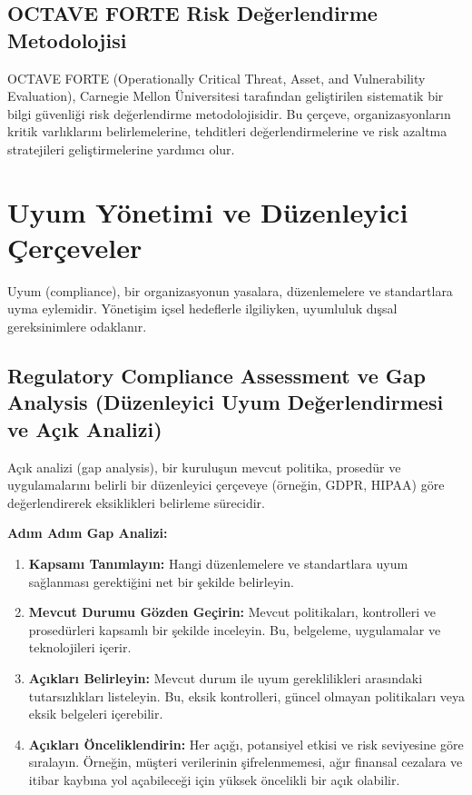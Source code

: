 \subsection{OCTAVE FORTE Risk Değerlendirme Metodolojisi}



OCTAVE FORTE (Operationally Critical Threat, Asset, and Vulnerability Evaluation), Carnegie Mellon Üniversitesi tarafından geliştirilen sistematik bir bilgi güvenliği risk değerlendirme metodolojisidir. Bu çerçeve, organizasyonların kritik varlıklarını belirlemelerine, tehditleri değerlendirmelerine ve risk azaltma stratejileri geliştirmelerine yardımcı olur.

\section{Uyum Yönetimi ve Düzenleyici Çerçeveler}

Uyum (compliance), bir organizasyonun yasalara, düzenlemelere ve standartlara uyma eylemidir. Yönetişim içsel hedeflerle ilgiliyken, uyumluluk dışsal gereksinimlere odaklanır.

\subsection{Regulatory Compliance Assessment ve Gap Analysis (Düzenleyici Uyum Değerlendirmesi ve Açık Analizi)}

Açık analizi (gap analysis), bir kuruluşun mevcut politika, prosedür ve uygulamalarını belirli bir düzenleyici çerçeveye (örneğin, GDPR, HIPAA) göre değerlendirerek eksiklikleri belirleme sürecidir.

\textbf{Adım Adım Gap Analizi:}
\begin{enumerate}
    \item \textbf{Kapsamı Tanımlayın:} Hangi düzenlemelere ve standartlara uyum sağlanması gerektiğini net bir şekilde belirleyin.
    \item \textbf{Mevcut Durumu Gözden Geçirin:} Mevcut politikaları, kontrolleri ve prosedürleri kapsamlı bir şekilde inceleyin. Bu, belgeleme, uygulamalar ve teknolojileri içerir.
    \item \textbf{Açıkları Belirleyin:} Mevcut durum ile uyum gereklilikleri arasındaki tutarsızlıkları listeleyin. Bu, eksik kontrolleri, güncel olmayan politikaları veya eksik belgeleri içerebilir.
    \item \textbf{Açıkları Önceliklendirin:} Her açığı, potansiyel etkisi ve risk seviyesine göre sıralayın. Örneğin, müşteri verilerinin şifrelenmemesi, ağır finansal cezalara ve itibar kaybına yol açabileceği için yüksek öncelikli bir açık olabilir.
\end{enumerate}


